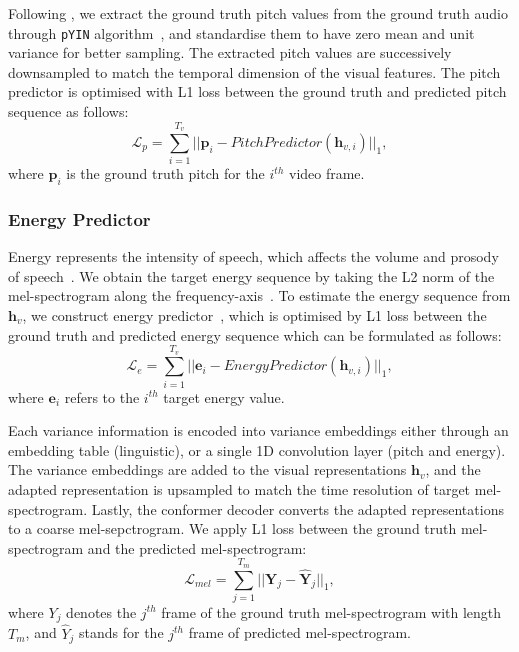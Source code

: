 \documentclass[letterpaper]{article} %
\begin{document}
Following \cite{lancucki2021fastpitch}, we extract the ground truth pitch values from the ground truth audio through \texttt{pYIN} algorithm~\cite{mauch2014pyin}, and standardise them to have zero mean and unit variance for better sampling.
The extracted pitch values are successively downsampled to match the temporal dimension of the visual features.
The pitch predictor is optimised with L1 loss between the ground truth and predicted pitch sequence as follows:
\begin{equation}
    \mathcal{L}_{p}=\sum_{i=1}^{T_v}||\boldsymbol{p}_{i}-PitchPredictor(\boldsymbol{h}_{v,i})||_1,
\end{equation}
where $\boldsymbol{p}_{i}$ is the ground truth pitch for the $i^{th}$ video frame.

\subsubsection{Energy Predictor}
Energy represents the intensity of speech, which affects the volume and prosody of speech~\cite{bulut2007analysis}. We obtain the target energy sequence by taking the L2 norm of the mel-spectrogram along the frequency-axis~\cite{choi2021neural}.
To estimate the energy sequence from $\boldsymbol{h}_v$, we construct energy predictor~\cite{ren2020fastspeech2}, which is optimised by L1 loss between the ground truth and predicted energy sequence which can be formulated as follows:
\begin{equation}
    \mathcal{L}_{e}=\sum_{i=1}^{T_v}||\boldsymbol{e}_{i}-EnergyPredictor(\boldsymbol{h}_{v,i})||_1,
\end{equation}
where $\boldsymbol{e}_{i}$ refers to the $i^{th}$ target energy value.

Each variance information is encoded into variance embeddings either through an embedding table (linguistic), or a single 1D convolution layer (pitch and energy).
The variance embeddings are added to the visual representations $\boldsymbol{h}_v$, and the adapted representation is upsampled to match the time resolution of target mel-spectrogram.
Lastly, the conformer decoder converts the adapted representations to a coarse mel-sepctrogram.
We apply L1 loss between the ground truth mel-spectrogram and the predicted mel-spectrogram:
\begin{equation}
    \mathcal{L}_{mel}=\sum_{j=1}^{T_m}||\boldsymbol{Y}_{j}-\boldsymbol{\hat{Y}}_{j}||_1,
\end{equation}
where $Y_{j}$ denotes the $j^{th}$ frame of the ground truth mel-spectrogram with length ${T_m}$, and $\hat{Y}_{j}$ stands for the $j^{th}$ frame of predicted mel-spectrogram.
\end{document}
